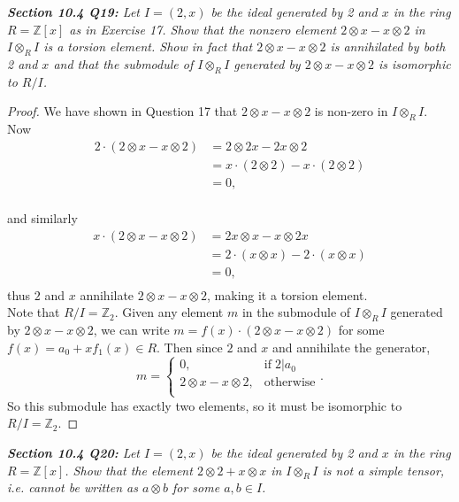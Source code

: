 \documentclass{article}
\begin{document}
\it \textbf{Section 10.4 Q19:} Let $I=(2,x)$ be the ideal generated by 2
  and $x$ in the ring $R=\mathbb{Z}[x]$ as in Exercise 17. Show that the
  nonzero element $2\otimes x-x\otimes2$ in $I\otimes_RI$ is a torsion
  element. Show in fact that $2\otimes x-x\otimes2$ is annihilated by both
  2 and $x$ and that the submodule of $I\otimes_RI$ generated by $2\otimes
  x-x\otimes2$ is isomorphic to $R/I$.

  \begin{proof}
    We have shown in Question 17 that $2\otimes x-x\otimes2$ is non-zero in
    $I\otimes_RI$. Now
    \begin{align*}
      2\cdot(2\otimes x-x\otimes2) &=2\otimes 2x-2x\otimes2\\
      &=x\cdot(2\otimes2) -x\cdot(2\otimes2)\\
      &=0,\\
    \end{align*}

    and similarly
    \begin{align*}
      x\cdot(2\otimes x-x\otimes2) &=2x\otimes x-x\otimes2x\\
      &=2\cdot(x\otimes x) -2\cdot(x\otimes x)\\
      &=0,\\
    \end{align*}
    thus $2$ and $x$ annihilate $2\otimes x-x\otimes2$, making it a torsion
    element. \\

    Note that $R/I=\mathbb{Z}_2$. Given any element $m$ in the submodule of
    $I\otimes_RI$ generated by $2\otimes x-x\otimes2$, we can write
    $m=f(x)\cdot(2\otimes x-x\otimes2)$ for some
    $f(x)=a_0+xf_1(x)\in R$. Then since $2$ and $x$ and annihilate the
    generator,
    \[m=
      \begin{cases}
        0, &\text{if}\; 2|a_0\\
        2\otimes x-x\otimes2, &\text{otherwise}\\
      \end{cases}.\]
    So this submodule has exactly two elements, so it must be isomorphic to
    $R/I=\mathbb{Z}_2$.
  \end{proof}

\it \textbf{Section 10.4 Q20:} Let $I=(2,x)$ be the ideal generated by 2
  and $x$ in the ring $R=\mathbb{Z}[x]$. Show that the element
  $2\otimes2+x\otimes x$ in $I\otimes_RI$ is not a simple tensor, i.e.
  cannot be written as $a\otimes b$ for some $a,b\in I$.
\end{document}
